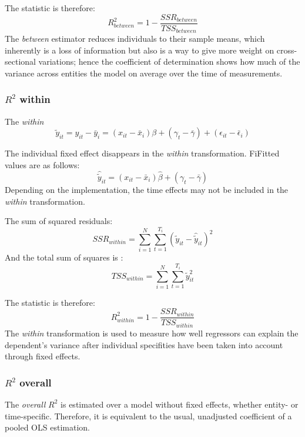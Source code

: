 The statistic is therefore:
\begin{equation}
  R^{2}_{between} = 1 - \frac{SSR_{between}}{TSS_{between}}
\end{equation}
The \textit{between} estimator reduces individuals to their sample means, which inherently is a loss of information but also is a way to give more weight on cross-sectional variations; hence the coefficient of determination shows how much of the variance across entities the model on average over the time of measurements.
\subsubsection{$R^2$ within}
The \textit{within}
\begin{equation}
  \tilde{y}_{it} = y_{it} - \bar{y}_{i} =  (x_{it} - \bar{x}_{i})\beta + (\gamma_{t} - \bar{\gamma}) + (\epsilon_{it} - \bar{\epsilon}_{i})
\end{equation}

The individual fixed effect disappears in the \textit{within} transformation. FiFitted values are as follows:
\begin{equation}
  \hat{\tilde{y}}_{it} = (x_{it} - \bar{x}_{i})\hat{\beta} + (\gamma_{t} - \bar{\gamma}) 
\end{equation}
Depending on the implementation, the time effects may not be included in the \textit{within} transformation.

The sum of squared residuals:
\begin{equation}
  SSR_{within} = \sum_{i = 1}^{N}\sum_{t = 1}^{T_{i}} (\tilde{y}_{it} - \hat{\tilde{y}}_{it})^2
\end{equation}
And the total sum of squares is :
\begin{equation}
  TSS_{within} = \sum_{i = 1}^{N}\sum_{t = 1}^{T_{i}} \tilde{y}_{it}^2 
\end{equation}

The statistic is therefore:
\begin{equation}
  R^{2}_{within} = 1 - \frac{SSR_{within}}{TSS_{within}}
\end{equation}
The \textit{within} transformation is used to measure how well regressors can explain the dependent's variance after individual specifities have been taken into account through fixed effects.
\subsubsection{$R^2$ overall}
The \textit{overall} $R^2$ is estimated over a model without fixed effects, whether entity- or time-specific. Therefore, it is equivalent to the usual, unadjusted coefficient of a pooled OLS estimation.

